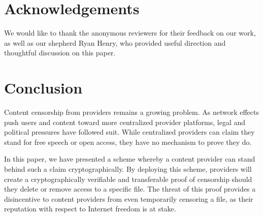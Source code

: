 \section{Acknowledgements}

We would like to thank the anonymous reviewers for their feedback on our work, as well
as our shepherd Ryan Henry, who provided useful direction and thoughtful discussion on
this paper.

\section{Conclusion}

Content censorship from providers remains a growing problem. As network effects
push users and content toward more centralized provider platforms, legal and
political pressures have followed suit. While centralized providers can claim
they stand for free speech or open access, they have no mechanism to prove they
do.

In this paper, we have presented a scheme whereby a content provider can stand
behind such a claim cryptographically. By deploying this scheme, providers will
create a cryptographically verifiable and transferable proof of censorship should
they delete or remove access to a specific file. The threat of this proof
provides a disincentive to content providers from even temporarily censoring a file, as
their reputation with respect to Internet freedom is at stake.



    
